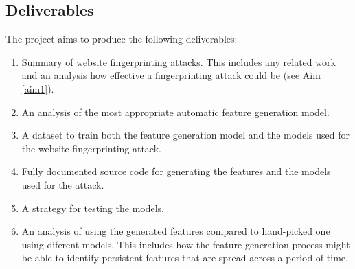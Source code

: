 \subsection{Deliverables}
The project aims to produce the following deliverables:
\begin{enumerate}
  \item Summary of website fingerprinting attacks. This includes any related work and an analysis how effective a fingerprinting attack could be (see Aim \ref{aim1}).
  \item An analysis of the most appropriate automatic feature generation model.
  \item A dataset to train both the feature generation model and the models used for the website fingerprinting attack.
  \item Fully documented source code for generating the features and the models used for the attack.
  \item A strategy for testing the models.
  \item An analysis of using the generated features compared to hand-picked one using diferent models. This includes how the feature generation process might be able to identify persistent features that are spread across a period of time.

\end{enumerate}

\newpage

